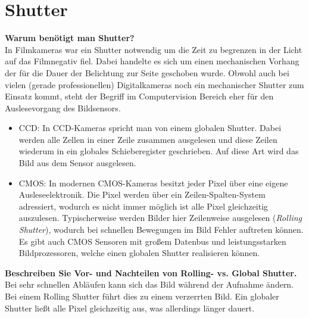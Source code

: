 \documentclass[a4paper]{article}
\begin{document}
	
	\section{Shutter}
	\textbf{Warum benötigt man Shutter?}\\
	In Filmkameras war ein Shutter notwendig um die Zeit zu begrenzen in der Licht auf das Filmnegativ fiel. Dabei handelte es sich um einen mechanischen Vorhang der für die Dauer der Belichtung zur Seite geschoben wurde. Obwohl auch bei vielen (gerade professionellen) Digitalkameras noch ein mechanischer Shutter zum Einsatz kommt, steht der Begriff im Computervision Bereich eher für den Auslesevorgang des Bildsensors.
	\begin{itemize}
		\item CCD: In CCD-Kameras spricht man von einem globalen Shutter. Dabei werden alle Zellen in einer Zeile zusammen ausgelesen und diese Zeilen wiederum in ein globales Schieberegister geschrieben. Auf diese Art wird das Bild aus dem Sensor ausgelesen.
		\item CMOS: In modernen CMOS-Kameras besitzt jeder Pixel über eine eigene Ausleseelektronik. Die Pixel werden über ein Zeilen-Spalten-System adressiert, wodurch es nicht immer möglich ist alle Pixel gleichzeitig auszulesen. Typischerweise werden Bilder hier Zeilenweise ausgelesen (\textit{Rolling Shutter}), wodurch bei schnellen Bewegungen im Bild Fehler auftreten können. Es gibt auch CMOS Sensoren mit großem Datenbus und leistungsstarken Bildprozessoren, welche einen globalen Shutter realisieren können.
	\end{itemize}
	\newpage
	\noindent
	\textbf{Beschreiben Sie Vor- und Nachteilen von Rolling- vs. Global Shutter.}\\
	Bei sehr schnellen Abläufen kann sich das Bild während der Aufnahme ändern. Bei einem Rolling Shutter führt dies zu einem verzerrten Bild. Ein globaler Shutter ließt alle Pixel gleichzeitig aus, was allerdings länger dauert.
	
\end{document}
